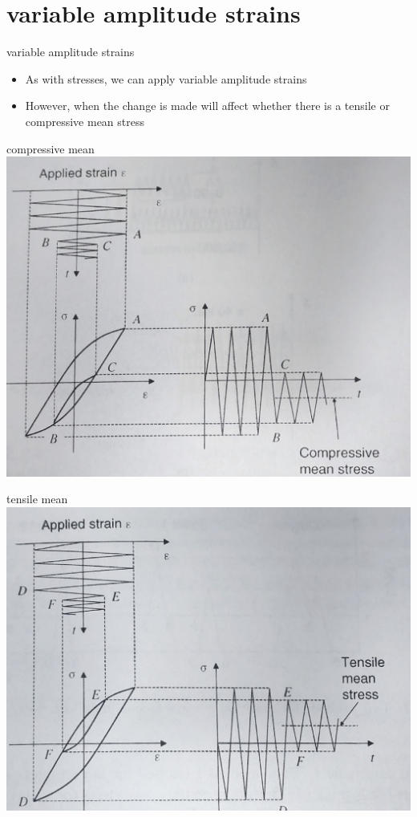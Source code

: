 \documentclass[
  letterpaper,
  ignorenonframetext,
  aspectratio=43,
  handout,
  12pt]{beamer}
\providecommand{\tightlist}{%
  \setlength{\itemsep}{0pt}\setlength{\parskip}{0pt}}
\providecommand{\tightlist}{%
\setlength{\itemsep}{0pt}\setlength{\parskip}{0pt}}
\let\Oldincludegraphics\includegraphics
\renewcommand{\includegraphics}[2][]{\Oldincludegraphics[width=\textwidth,height=0.7\textheight,keepaspectratio]{#2}}
\begin{document}
\hypertarget{variable-amplitude-strains}{%
\section{variable amplitude strains}\label{variable-amplitude-strains}}

\begin{frame}{variable amplitude strains}
\protect\hypertarget{variable-amplitude-strains-1}{}
\begin{itemize}
\tightlist
\item
  As with stresses, we can apply variable amplitude strains
\item
  However, when the change is made will affect whether there is a
  tensile or compressive mean stress
\end{itemize}
\end{frame}

\begin{frame}{compressive mean}
\protect\hypertarget{compressive-mean}{}
\includegraphics{../images/compressive_mean.jpg}
\end{frame}

\begin{frame}{tensile mean}
\protect\hypertarget{tensile-mean}{}
\includegraphics{../images/tensile_mean.jpg}
\end{frame}
\end{document}
